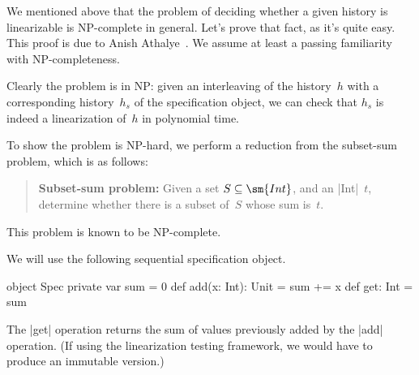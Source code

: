 
We mentioned above that the problem of deciding whether a given history is
linearizable is NP-complete in general.  Let's prove that fact, as it's quite easy.  This
proof is due to Anish Athalye~\cite{Athalye}.  We assume at least a passing
familiarity with NP-completeness.

Clearly the problem is in NP: given an interleaving of the history~$h$ with a
corresponding history~$h_s$ of the specification object, we can check that
$h_s$ is indeed a linearization of~$h$ in polynomial time.

To show the problem is NP-hard, we perform a reduction
from the subset-sum problem, which is as follows:
\begin{quote}
\textbf{Subset-sum problem:} Given a set $S \subseteq \sm{Int}$, and an
|Int|~$t$, determine whether there is a subset of~$S$ whose sum is~$t$. 
\end{quote}
%
This problem is known to be NP-complete.  

We will use the following sequential specification object.
\begin{scala}
object Spec{
  private var sum = 0
  def add(x: Int): Unit = sum += x
  def get: Int = sum 
}
\end{scala}
The |get| operation returns the sum of values previously added by the |add|
operation. 
(If using the linearization testing framework, we would have to produce an
immutable version.)
%

